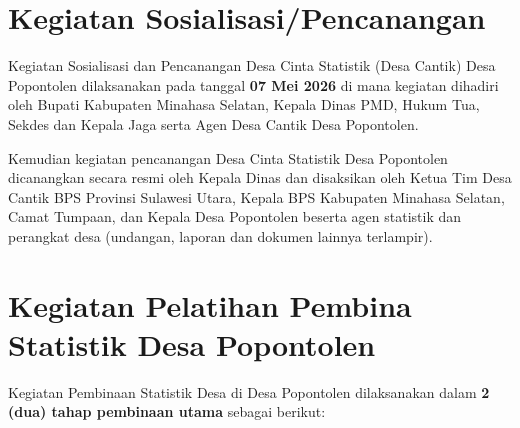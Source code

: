\section{Kegiatan Sosialisasi/Pencanangan}

Kegiatan Sosialisasi dan Pencanangan Desa Cinta Statistik (Desa Cantik) Desa Popontolen dilaksanakan pada tanggal \textbf{07 Mei 2026} di mana kegiatan dihadiri oleh Bupati Kabupaten Minahasa Selatan, Kepala Dinas PMD, Hukum Tua, Sekdes dan Kepala Jaga serta Agen Desa Cantik Desa Popontolen.

Kemudian kegiatan pencanangan Desa Cinta Statistik Desa Popontolen dicanangkan secara resmi oleh Kepala Dinas dan disaksikan oleh Ketua Tim Desa Cantik BPS Provinsi Sulawesi Utara, Kepala BPS Kabupaten Minahasa Selatan, Camat Tumpaan, dan Kepala Desa Popontolen beserta agen statistik dan perangkat desa (undangan, laporan dan dokumen lainnya terlampir).

\section{Kegiatan Pelatihan Pembina Statistik Desa Popontolen}

Kegiatan Pembinaan Statistik Desa di Desa Popontolen dilaksanakan dalam \textbf{2 (dua) tahap pembinaan utama} sebagai berikut:


